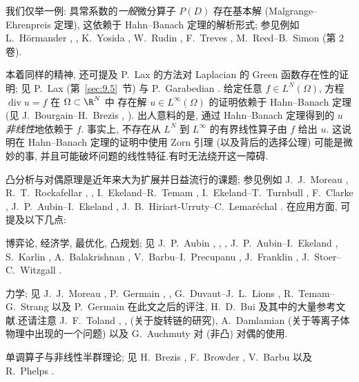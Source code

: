 我们仅举一例: 具常系数的\emph{一般}微分算子 $P(D)$ 存在基本解 (Malgrange--Ehrenpreis
定理), 这依赖于 Hahn--Banach 定理的解析形式; 参见例如 L.~Hörmander
, , K.~Yosida , W.~Rudin , F.~Treves , M.~Reed--B.~Simon  (第 2 卷).

本着同样的精神, 还可提及 P.~Lax 的方法对 Laplacian 的 Green 函数存在性的证明;
见 P.~Lax  (第~\ref{sec:9.5}~节) 与 P.~Garabedian .
给定任意 $f\in L^N(\Omega)$, 方程 $\operatorname{div}u=f$ 在 $\Omega\subset\R^N$ 中
存在解 $u\in L^\infty(\Omega)$ 的证明依赖于 Hahn--Banach 定理 (见
J.~Bourgain--H.~Brezis , ).
出人意料的是, 通过 Hahn--Banach 定理得到的 $u$ \emph{非线性}地依赖于 $f$.
事实上, 不存在从 $L^N$ 到 $L^\infty$ 的有界线性算子由 $f$ 给出 $u$.
这说明在 Hahn--Banach 定理的证明中使用 Zorn 引理 (以及背后的选择公理)
可能是微妙的事, 并且可能破坏问题的线性特征.有时无法绕开这一障碍.

凸分析与对偶原理是近年来大为扩展并日益流行的课题; 参见例如 J.~J.~Moreau
, R.~T.~Rockafellar , , I.~Ekeland--R.~Temam , I.~Ekeland--T.~Turnbull , F.~Clarke , J.~P.~Aubin--I.~Ekeland , J.~B.~Hiriart-Urruty--C.~Lemaréchal .
在应用方面, 可提及以下几点:

博弈论, 经济学, 最优化, 凸规划; 见 J.~P.~Aubin , , , J.~P.~Aubin--I.~Ekeland , S.~Karlin
, A.~Balakrishnan , V.~Barbu--I.~Precupanu , J.~Franklin , J.~Stoer--C.~Witzgall .

力学; 见 J.~J.~Moreau , P.~Germain , , G.~Duvaut--J.~L.~Lions , R.~Temam--G.~Strang  以及 P.~Germain 在此文之后的评注, H.~D.~Bui  及其中的大量参考文献.还请注意 J.~F.~Toland
, ,  (关于旋转链的研究), A.~Damlamian  (关于等离子体物理中出现的一个问题)
以及 G.~Auchmuty  对 (非凸) 对偶的使用.

单调算子与非线性半群理论; 见 H.~Brezis , F.~Browder
, V.~Barbu  以及 R.~Phelps .

